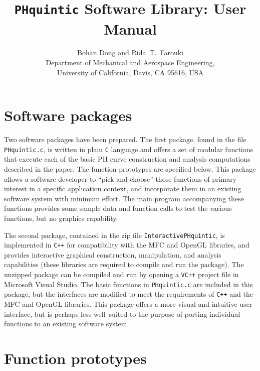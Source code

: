 \documentclass[12pt]{article}
\begin{document}
\title{{\tt PHquintic} Software Library: User Manual}

\author{
Bohan Dong and Rida~T.~Farouki \\
Department of Mechanical and Aerospace Engineering, \\
University of California, Davis, CA 95616, USA
}

\date{}

\maketitle

\thispagestyle{empty}

\newpage
\setcounter{page}{1}

\section{Software packages}

Two software packages have been prepared. The first package, found in the 
file {\tt PHquintic.c}, is written in plain {\tt C} language and offers a 
set of modular functions that execute each of the basic PH curve construction 
and analysis computations described in the paper. The function prototypes 
are specified below. This package allows a software developer to ``pick and 
choose'' those functions of primary interest in a specific application 
context, and incorporate them in an existing software system with minimum 
effort. The main program accompanying these functions provides some sample 
data and function calls to test the various functions, but no graphics 
capability.

The second package, contained in the zip file {\tt InteractivePHquintic}, 
is implemented in {\tt C++} for compatibility with the MFC and OpenGL 
libraries, and provides interactive graphical construction, manipulation, 
and analysis capabilities (these libraries are required to compile and run 
the package). The unzipped package can be compiled and run by opening a 
{\tt VC++} project file in Microsoft Visual Studio. The basic functions 
in {\tt PHquintic.c} are included in this package, but the interfaces are 
modified to meet the requirements of {\tt C++} and the MFC and OpenGL 
libraries. This package offers a more visual and intuitive user interface, 
but is perhaps less well--suited to the purpose of porting individual 
functions to an existing software system.

\section{Function prototypes}
\end{document}

